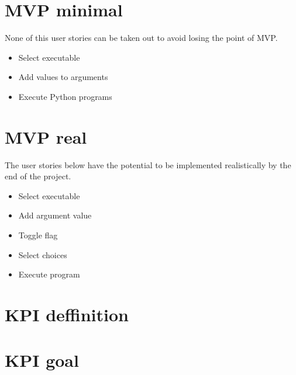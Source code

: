 \documentclass{article}
\begin{document}
\section{MVP minimal}
None of this user stories can be taken out to avoid losing the point of MVP.
\begin{itemize}
    \item Select executable
    \item Add values to arguments
    \item Execute Python programs
\end{itemize}

\section{MVP real}
The user stories below have the potential to be implemented realistically by the end of the project.
\begin{itemize}
    \item Select executable
    \item Add argument value
    \item Toggle flag
    \item Select choices
    \item Execute program
\end{itemize}

\section{KPI deffinition}

\section{KPI goal}
\end{document}
